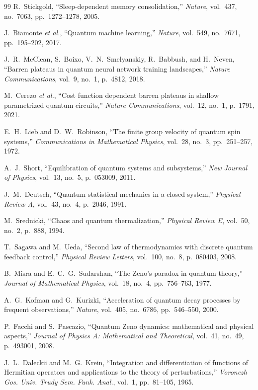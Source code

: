 \documentclass[10pt,twocolumn,3p]{article}
\begin{document}
\begin{thebibliography}{99}
R.~Stickgold,
``Sleep-dependent memory consolidation,''
\textit{Nature}, vol.~437, no.~7063, pp.~1272--1278, 2005.

J.~Biamonte \textit{et al.},
``Quantum machine learning,''
\textit{Nature}, vol.~549, no.~7671, pp.~195--202, 2017.

J.~R.~McClean, S.~Boixo, V.~N.~Smelyanskiy, R.~Babbush, and H.~Neven,
``Barren plateaus in quantum neural network training landscapes,''
\textit{Nature Communications}, vol.~9, no.~1, p.~4812, 2018.

M.~Cerezo \textit{et al.},
``Cost function dependent barren plateaus in shallow parametrized quantum circuits,''
\textit{Nature Communications}, vol.~12, no.~1, p.~1791, 2021.

E.~H.~Lieb and D.~W.~Robinson,
``The finite group velocity of quantum spin systems,''
\textit{Communications in Mathematical Physics}, vol.~28, no.~3, pp.~251--257, 1972.

A.~J.~Short,
``Equilibration of quantum systems and subsystems,''
\textit{New Journal of Physics}, vol.~13, no.~5, p.~053009, 2011.

J.~M.~Deutsch,
``Quantum statistical mechanics in a closed system,''
\textit{Physical Review A}, vol.~43, no.~4, p.~2046, 1991.

M.~Srednicki,
``Chaos and quantum thermalization,''
\textit{Physical Review E}, vol.~50, no.~2, p.~888, 1994.

T.~Sagawa and M.~Ueda,
``Second law of thermodynamics with discrete quantum feedback control,''
\textit{Physical Review Letters}, vol.~100, no.~8, p.~080403, 2008.

B.~Misra and E.~C.~G.~Sudarshan,
``The Zeno's paradox in quantum theory,''
\textit{Journal of Mathematical Physics}, vol.~18, no.~4, pp.~756--763, 1977.

A.~G.~Kofman and G.~Kurizki,
``Acceleration of quantum decay processes by frequent observations,''
\textit{Nature}, vol.~405, no.~6786, pp.~546--550, 2000.

P.~Facchi and S.~Pascazio,
``Quantum Zeno dynamics: mathematical and physical aspects,''
\textit{Journal of Physics A: Mathematical and Theoretical}, vol.~41, no.~49, p.~493001, 2008.

J.~L.~Daleckii and M.~G.~Krein,
``Integration and differentiation of functions of Hermitian operators and applications to the theory of perturbations,''
\textit{Voronezh Gos. Univ. Trudy Sem. Funk. Anal.}, vol.~1, pp.~81--105, 1965.


\end{thebibliography}
\end{document}
